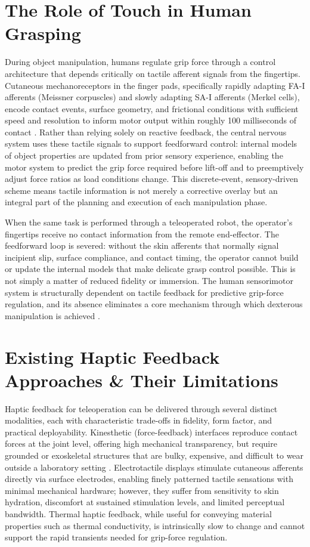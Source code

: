 \documentclass[12pt, a4paper]{report}
\begin{document}
\section{The Role of Touch in Human Grasping}
During object manipulation, humans regulate grip force through a control architecture that depends critically on tactile afferent signals from the fingertips. Cutaneous mechanoreceptors in the finger pads, specifically rapidly adapting FA-I afferents (Meissner corpuscles) and slowly adapting SA-I afferents (Merkel cells), encode contact events, surface geometry, and frictional conditions with sufficient speed and resolution to inform motor output within roughly 100 milliseconds of contact \cite{johansson2009}. Rather than relying solely on reactive feedback, the central nervous system uses these tactile signals to support feedforward control: internal models of object properties are updated from prior sensory experience, enabling the motor system to predict the grip force required before lift-off and to preemptively adjust force ratios as load conditions change. This discrete-event, sensory-driven scheme means tactile information is not merely a corrective overlay but an integral part of the planning and execution of each manipulation phase.

When the same task is performed through a teleoperated robot, the operator's fingertips receive no contact information from the remote end-effector. The feedforward loop is severed: without the skin afferents that normally signal incipient slip, surface compliance, and contact timing, the operator cannot build or update the internal models that make delicate grasp control possible. This is not simply a matter of reduced fidelity or immersion. The human sensorimotor system is structurally dependent on tactile feedback for predictive grip-force regulation, and its absence eliminates a core mechanism through which dexterous manipulation is achieved \cite{johansson2009}.

\section{Existing Haptic Feedback Approaches \& Their Limitations}
Haptic feedback for teleoperation can be delivered through several distinct modalities, each with characteristic trade-offs in fidelity, form factor, and practical deployability. Kinesthetic (force-feedback) interfaces reproduce contact forces at the joint level, offering high mechanical transparency, but require grounded or exoskeletal structures that are bulky, expensive, and difficult to wear outside a laboratory setting \cite{pacchierotti2017}. Electrotactile displays stimulate cutaneous afferents directly via surface electrodes, enabling finely patterned tactile sensations with minimal mechanical hardware; however, they suffer from sensitivity to skin hydration, discomfort at sustained stimulation levels, and limited perceptual bandwidth. Thermal haptic feedback, while useful for conveying material properties such as thermal conductivity, is intrinsically slow to change and cannot support the rapid transients needed for grip-force regulation.
\end{document}
